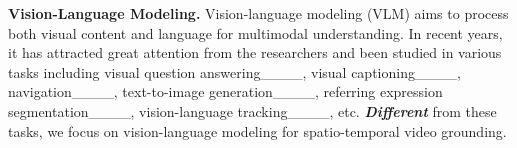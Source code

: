\textbf{Vision-Language Modeling.} Vision-language modeling (VLM) aims to process both visual content and language for multimodal understanding. In recent years, it has attracted great attention from the researchers and been studied in various tasks including visual question answering____, visual captioning____, navigation____, text-to-image generation____, referring expression segmentation____, vision-language tracking____, etc. \emph{\textbf{Different}} from these tasks, we focus on vision-language modeling for spatio-temporal video grounding.